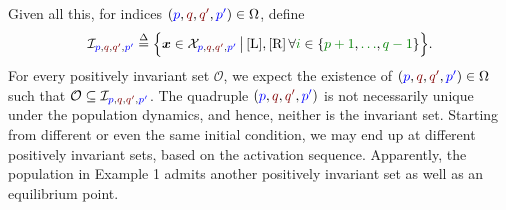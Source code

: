 \documentclass[10 pt,twocolumn,journal]{IEEEtran}
\DeclarePairedDelimiter{\floor}{\lfloor}{\rfloor}
\theoremstyle{plain}
\newcommand{\db}{\overset{\Delta}{=}}
\newcommand{\A}{\mathcal{A}}
\renewcommand{\O}{\mathcal{O}}
\newcommand{\I}{\mathcal{I}}
\newcommand{\X}{\mathcal{X}}
\newcommand{\x}{\bm{x}}
\newcommand{\p}{\tb{p}}
\newcommand{\pp}{\tb{p'}}
\newcommand{\q}{\tr{q}}
\newcommand{\qq}{\tr{q'}}
\renewcommand{\A}{\mathtt{A}}
\newcommand{\B}{\mathtt{B}}
\newcommand{\tb}{\textcolor{blue}}
\newcommand{\tr}{\textcolor{Myred}}
\newcommand{\tg}{\textcolor{Mygreen}}
\theoremstyle{definition}
\begin{document}
Given all this, for indices $(\tb{p},\tr{q},\tr{\qq },\tb{\pp })\in\Omega$, define 
\begin{equation*}\scalebox{.98}{\text{$
	\I_{\tb{p},\tr{q},\tr{\qq },\tb{\pp }}
    \db
    \Big\{ \x  \in \X_{\tb{p},\tr{q},\tr{\qq },\tb{\pp }}\, \big|\, 
      \eqref{L}, \eqref{R}\, \forall \tg{i}\in\{\tg{p+1},\tg{\ldots},\tg{q-1}\}\Big\}$}}.
\end{equation*}
For every positively invariant set $\O$, we expect the existence of $(\tb{p},\tr{q},\tr{\qq },\tb{\pp })\in\Omega$ such that $\O\subseteq 	\I_{\tb{p},\tr{q},\tr{\qq },\tb{\pp }}$.
%
The quadruple $(\p,\q,\qq,\pp)$ is not necessarily unique under the population dynamics, and hence, neither is the invariant set. 
Starting from different or even the same initial condition, we may end up at different positively invariant sets, based on the activation sequence. 
Apparently, the population in Example 1 admits another positively invariant set as well as an equilibrium point.
%
\setcounter{example}{0}
\end{document}
